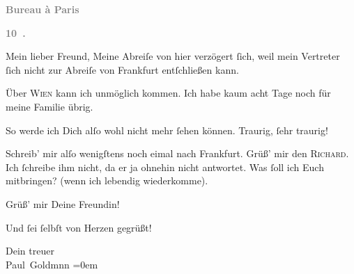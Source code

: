 \pstart
           \begin{otherlanguage}{french}\textcolor{gray}{\textbf{\textbf{Bureau à Paris}}}\end{otherlanguage}\pend
           
\pstart
           \begin{otherlanguage}{french}\textcolor{gray}{\textbf{\textbf{10 .}}}\end{otherlanguage}\pend
           
\pstart\center{}Mein lieber Freund,\pend\vspace{0.5em}
\pstart
           Meine Abreiſe von hier
               verzögert ſich, weil mein Vertreter ſich nicht zur Abreiſe von Frankfurt entſchließen kann.\pend
           
\pstart
           Über \textsc{Wien} kann ich unmöglich kommen. Ich habe kaum acht Tage noch für meine Familie
               übrig.\pend
           
\pstart
           So werde ich Dich alſo wohl nicht mehr ſehen können. Traurig, ſehr traurig!\pend
           
\pstart
           {\pb}Schreib’ mir alſo wenigſtens noch eimal nach Frankfurt. Grüß’ mir den \textsc{Richard}. Ich ſchreibe ihm nicht, da er ja ohnehin nicht antwortet. Was ſoll ich Euch
               mitbringen? (wenn ich lebendig wiederkomme).\pend
           
\pstart
           Grüß’ mir Deine Freundin!\pend
           
\pstart
           Und ſei ſelbſt von Herzen gegrüßt!\pend
           
\pstart
           Dein treuer {\\[\baselineskip]}\spacefill\mbox{Paul Goldmnn}\pend
           \leftskip=0em{}\endnumbering{}  
      